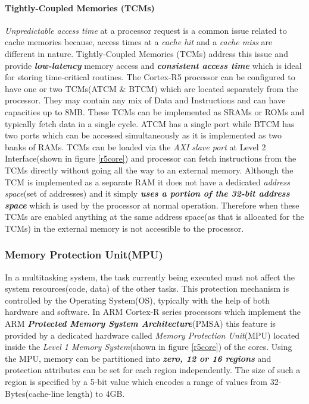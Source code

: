 \documentclass[a4paper,11pt]{article}
\begin{document}
\paragraph{Tightly-Coupled Memories (TCMs)}  \textit{Unpredictable access time} at a processor request is a common issue related to cache memories because, access times at a \textit{cache hit} and a \textit{cache miss} are different in nature. Tightly-Coupled Memories (TCMs) address this issue and provide \textbf{\textit{low-latency}} memory access and \textbf{\textit{consistent access time}} which is ideal for storing time-critical routines\cite{crspg}. The Cortex-R5 processor can be configured to have one or two TCMs(ATCM \& BTCM) which are located separately from the processor. They may contain any mix of Data and Instructions and can have capacities up to 8MB. These TCMs can be implemented as SRAMs or ROMs and typically fetch data in a single cycle. ATCM has a single port while BTCM has two ports which can be accessed simultaneously as it is implemented as two banks of RAMs. TCMs can be loaded via the \textit{AXI slave port} at Level 2 Interface(shown in figure \ref{r5core}) and processor can fetch instructions from the TCMs directly without going all the way to an external memory. Although the TCM is implemented as a separate RAM it does not have a dedicated \textit{address space}(set of addresses) and it simply \textbf{\textit{uses a portion of the 32-bit address space}} which is used by the processor at normal operation. Therefore when these TCMs are enabled anything at the same address space(as that is allocated for the TCMs) in the external memory is not accessible to the processor\cite{crtrm}.


\subsubsection{Memory Protection Unit(MPU)}

In a multitasking system, the task currently being executed must not affect the system resources(code, data) of the other tasks. This protection mechanism is controlled by the Operating System(OS), typically with the help of both hardware and software. In ARM Cortex-R series processors which implement the ARM \textit{\textbf{Protected Memory System Architecture}}(PMSA) this feature is provided by a dedicated hardware called \textit{Memory Protection Unit}(MPU)\cite{crspg} located inside the \textit{Level 1 Memory System}(shown in figure \ref{r5core}) of the cores. Using the MPU,  memory can be partitioned into \textbf{\textit{zero, 12 or 16 regions}} and protection attributes can be set for each region independently. The size of such a region is specified by a 5-bit value which encodes a range of values from 32-Bytes(cache-line length) to 4GB.\cite{crtrm}
\end{document}
